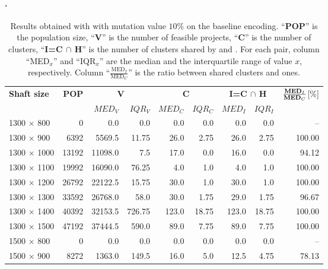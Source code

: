 \paragraph{\liftcreatega.}
%
\begin{table}[t]
	\caption{\label{table:genProjResult10}Results obtained with \liftcreatega{}
		with mutation value $10$\% on the baseline encoding. ``\textbf{POP}''
		is the population size, 
		``\textbf{V}'' is the number of feasible projects, ``\textbf{C}'' is the
		number of clusters, ``\textbf{I=C $\cap$ H}'' is the number of clusters
		shared by \liftcreatega{} and \liftcreatehr.
		For each pair, column ``MED$_x$'' and ``IQR$_x$'' are the median and the
		interquartile range of value $x$, respectively. Column
		``$\frac{\text{MED}_I}{\text{MED}_C}$'' is the
		ratio between shared clusters and \liftcreatega{} ones.} 
	\centering
	\renewcommand{\arraystretch}{1.2}
	\begin{tabular}{l r rr rr rr r}
		\toprule
		\multirow{2}{*}{\bf Shaft size} 
		& \multirow{2}{*}{\bf POP} & \multicolumn{2}{c}{\bf V} & \multicolumn{2}{c}{\bf C} &
		\multicolumn{2}{c}{\bf I=C $\cap$ H} & 
		\multirow{2}{*}{$\frac{\text{\textbf{MED}}_I}{\text{\textbf{MED}}_C}$[\%]}\\
		\cmidrule{3-8}
		&& { $MED_V$} & {$IQR_V$} & {$MED_C$} & {$IQR_C$} & {$MED_I$}
		& {$IQR_I$} & \\
		\midrule
		1300 $\times$ 800 & 0 & 0.0 & 0.0 & 0.0 & 0.0 & 0.0 & 0.0 & --\\
		1300 $\times$ 900 & 6392 & 5569.5 & 11.75 & 26.0 & 2.75 & 26.0 & 2.75 & 100.00\\
		1300 $\times$ 1000 & 13192 & 11098.0 & 7.5 & 17.0 & 0.0 & 16.0 & 0.0 & 94.12\\
		1300 $\times$ 1100 & 19992 & 16090.0 & 76.25 & 4.0 & 1.0 & 4.0 & 1.0 & 100.00\\
		1300 $\times$ 1200 & 26792 & 22122.5 & 15.75 & 30.0 & 1.0 & 30.0 & 1.0 & 100.00\\
		1300 $\times$ 1300 & 33592 & 26768.0 & 58.0 & 30.0 & 1.75 & 29.0 & 1.75 & 96.67\\
		1300 $\times$ 1400 & 40392 & 32153.5 & 726.75 & 123.0 & 18.75 & 123.0 & 18.75 & 100.00\\
		1300 $\times$ 1500 & 47192 & 37444.5 & 590.0 & 89.0 & 7.75 & 89.0 & 7.75 & 100.00\\
		1500 $\times$ 800 & 0 & 0.0 & 0.0 & 0.0 & 0.0 & 0.0 & 0.0 & --\\
		1500 $\times$ 900 & 8272 & 1363.0 & 149.5 & 16.0 & 5.0 & 12.5 & 4.75 & 78.13\\

\end{tabular}
\end{table}
